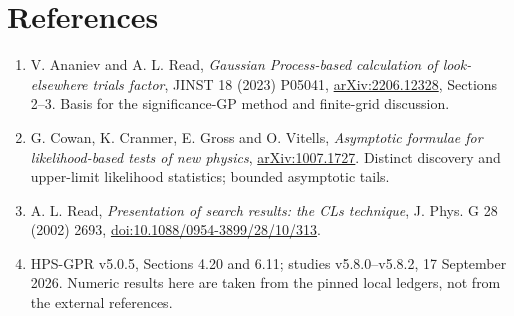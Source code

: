 \documentclass[11pt]{article}
\newcommand{\heading}[1]{\section*{\color{navy}#1}}
\begin{document}
\heading{References}
\begin{enumerate}\small
\item V. Ananiev and A. L. Read, \textit{Gaussian Process-based calculation of look-elsewhere trials factor}, JINST 18 (2023) P05041, \href{https://arxiv.org/pdf/2206.12328}{arXiv:2206.12328}, Sections 2--3. Basis for the significance-GP method and finite-grid discussion.
\item G. Cowan, K. Cranmer, E. Gross and O. Vitells, \textit{Asymptotic formulae for likelihood-based tests of new physics}, \href{https://arxiv.org/abs/1007.1727}{arXiv:1007.1727}. Distinct discovery and upper-limit likelihood statistics; bounded asymptotic tails.
\item A. L. Read, \textit{Presentation of search results: the CLs technique}, J. Phys. G 28 (2002) 2693, \href{https://doi.org/10.1088/0954-3899/28/10/313}{doi:10.1088/0954-3899/28/10/313}.
\item HPS-GPR v5.0.5, Sections 4.20 and 6.11; studies v5.8.0--v5.8.2, 17 September 2026. Numeric results here are taken from the pinned local ledgers, not from the external references.
\end{enumerate}
\end{document}
